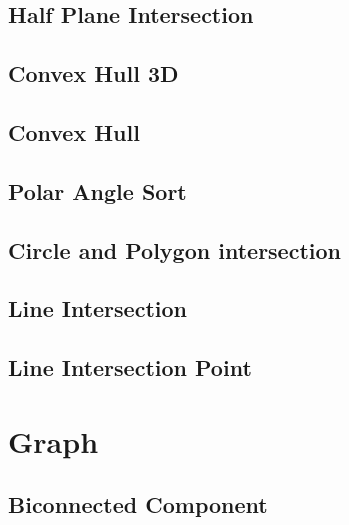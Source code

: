 \documentclass[a4paper,10pt,twocolumn,oneside]{article}
\begin{document}
\subsection{Half Plane Intersection}


%

\subsection{Convex Hull 3D}


\subsection{Convex Hull}


\subsection{Polar Angle Sort}


\subsection{Circle and Polygon intersection}


\subsection{Line Intersection}


\subsection{Line Intersection Point}


\section{Graph}
\subsection{Biconnected Component}

\end{document}
